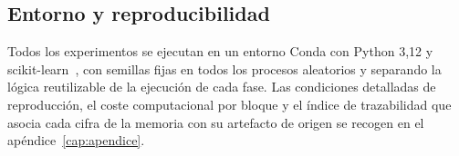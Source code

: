 \subsection{Entorno y reproducibilidad}

Todos los experimentos se ejecutan en un entorno Conda con Python 3{,}12
y scikit-learn~\cite{pedregosa2011}, con semillas fijas en todos los
procesos aleatorios y separando la lógica reutilizable de la ejecución
de cada fase. Las condiciones detalladas de reproducción, el coste
computacional por bloque y el índice de trazabilidad que asocia cada
cifra de la memoria con su artefacto de origen se recogen en el
apéndice~\ref{cap:apendice}.
